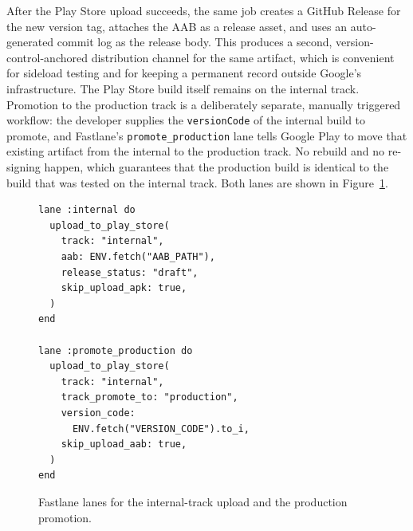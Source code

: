 After the Play Store upload succeeds, the same job creates a GitHub Release for the new version tag, attaches the AAB as a release asset, and uses an auto-generated commit log as the release body. This produces a second, version-control-anchored distribution channel for the same artifact, which is convenient for sideload testing and for keeping a permanent record outside Google's infrastructure. The Play Store build itself remains on the internal track. Promotion to the production track is a deliberately separate, manually triggered workflow: the developer supplies the \texttt{versionCode} of the internal build to promote, and Fastlane's \texttt{promote\_production} lane tells Google Play to move that existing artifact from the internal to the production track. No rebuild and no re-signing happen, which guarantees that the production build is identical to the build that was tested on the internal track. Both lanes are shown in Figure~\ref{fig:fastlane-lanes}.

\begin{figure}[htbp]
  {\small\begin{verbatim}
lane :internal do
  upload_to_play_store(
    track: "internal",
    aab: ENV.fetch("AAB_PATH"),
    release_status: "draft",
    skip_upload_apk: true,
  )
end

lane :promote_production do
  upload_to_play_store(
    track: "internal",
    track_promote_to: "production",
    version_code:
      ENV.fetch("VERSION_CODE").to_i,
    skip_upload_aab: true,
  )
end
\end{verbatim}}
  \caption{Fastlane lanes for the internal-track upload and the production promotion.}
  \label{fig:fastlane-lanes}
\end{figure}
